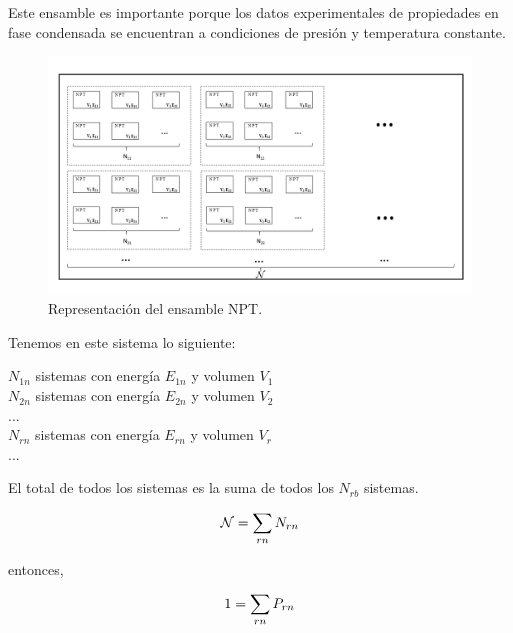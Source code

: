 Este ensamble es importante porque los datos experimentales de propiedades en fase condensada se encuentran a condiciones de presión y temperatura constante.\\

\begin{figure}[!h]
    \centering
    \includegraphics[width=1\textwidth,keepaspectratio=true]{StatMech/nptensemblefig.png}
    \caption{Representación del ensamble NPT.}
    \label{fig:NPTEns}
\end{figure}

Tenemos en este sistema lo siguiente:\\

\begin{center}
    $N_{1n}$ sistemas con energía $E_{1n}$ y volumen $V_1$\\
    $N_{2n}$ sistemas con energía $E_{2n}$ y volumen $V_2$\\
    ...\\
    $N_{rn}$ sistemas con energía $E_{rn}$ y volumen $V_r$\\
    ...\\
\end{center}

El total de todos los sistemas es la suma de todos los $N_{rb}$ sistemas.

\begin{equation} \label{conteoprobNPT}
    \mathcal{N} = \sum_{rn} N_{rn} \\
\end{equation}

entonces,

\begin{equation} \label{restrprobNPT}
    1 = \sum_{rn} P_{rn} \\
\end{equation}

